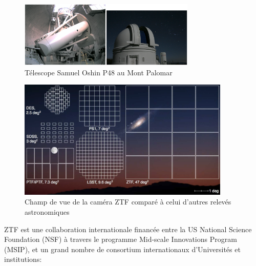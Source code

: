 \documentclass[../main/main.tex]{subfiles}
\begin{document}
\begin{figure}[h]
  \centering
  \includegraphics[width=0.75\textwidth]{../figures/02_ztf/p48.png}
  \caption{Télescope Samuel Oshin P48 au Mont Palomar}
  \label{fig:p48}
\end{figure}


\begin{figure}[h]
\centering
\includegraphics[width=0.9\textwidth]{../figures/02_ztf/ztfcamerafov.png}
\caption{Champ de vue de la caméra ZTF comparé à celui d'autres relevés astronomiques }
\label{fig:ztfcamerafov}
\end{figure}

ZTF est une collaboration internationale financée entre
la US National Science Foundation (NSF) à travers le  programme Mid-scale
Innovations Program (MSIP), et un grand nombre de consortium
internationaux d'Universités et institutions:
\end{document}
